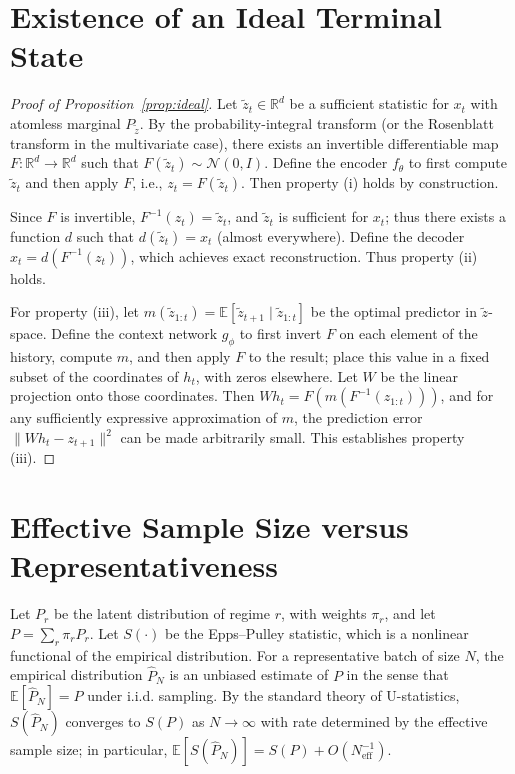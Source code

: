 \documentclass[10pt]{article}
\theoremstyle{remark}
\begin{document}
\appendix

\section{Existence of an Ideal Terminal State}
\label{app:existence}

\begin{proof}[Proof of Proposition~\ref{prop:ideal}]
Let $\tilde{z}_t \in \mathbb{R}^d$ be a sufficient statistic for $x_t$ with atomless marginal $P_{\tilde{z}}$. By the probability-integral transform (or the Rosenblatt transform in the multivariate case), there exists an invertible differentiable map $F : \mathbb{R}^d \to \mathbb{R}^d$ such that $F(\tilde{z}_t) \sim \mathcal{N}(0,I)$. Define the encoder $f_\theta$ to first compute $\tilde{z}_t$ and then apply $F$, i.e., $z_t = F(\tilde{z}_t)$. Then property (i) holds by construction.

Since $F$ is invertible, $F^{-1}(z_t) = \tilde{z}_t$, and $\tilde{z}_t$ is sufficient for $x_t$; thus there exists a function $d$ such that $d(\tilde{z}_t) = x_t$ (almost everywhere). Define the decoder $\hat{x}_t = d(F^{-1}(z_t))$, which achieves exact reconstruction. Thus property (ii) holds.

For property (iii), let $m(\tilde{z}_{1:t}) = \mathbb{E}[\tilde{z}_{t+1} \mid \tilde{z}_{1:t}]$ be the optimal predictor in $\tilde{z}$-space. Define the context network $g_\phi$ to first invert $F$ on each element of the history, compute $m$, and then apply $F$ to the result; place this value in a fixed subset of the coordinates of $h_t$, with zeros elsewhere. Let $W$ be the linear projection onto those coordinates. Then $W h_t = F(m(F^{-1}(z_{1:t})))$, and for any sufficiently expressive approximation of $m$, the prediction error $\|W h_t - z_{t+1}\|^2$ can be made arbitrarily small. This establishes property (iii). \end{proof}

\section{Effective Sample Size versus Representativeness}
\label{app:ess-rep}

Let $P_r$ be the latent distribution of regime $r$, with weights $\pi_r$, and let $P = \sum_r \pi_r P_r$. Let $S(\cdot)$ be the Epps--Pulley statistic, which is a nonlinear functional of the empirical distribution. For a representative batch of size $N$, the empirical distribution $\hat{P}_N$ is an unbiased estimate of $P$ in the sense that $\mathbb{E}[\hat{P}_N] = P$ under i.i.d. sampling. By the standard theory of U-statistics, $S(\hat{P}_N)$ converges to $S(P)$ as $N\to\infty$ with rate determined by the effective sample size; in particular, $\mathbb{E}[S(\hat{P}_N)] = S(P) + O(N_{\mathrm{eff}}^{-1})$.
\end{document}

